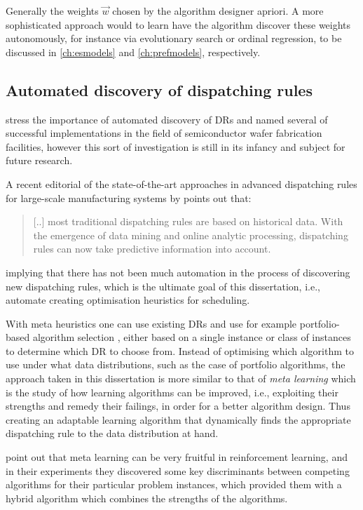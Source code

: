 Generally the weights $\vec{w}$ chosen by the algorithm designer apriori. 
A more sophisticated approach would to learn have the algorithm discover these weights autonomously, for instance via evolutionary search or ordinal regression, to be discussed in \cref{ch:esmodels} and \cref{ch:prefmodels}, respectively.

\subsection{Automated discovery of dispatching rules}
\citet{Monch13} stress the importance of automated discovery of DRs and named several of successful implementations in the field of semiconductor wafer fabrication facilities, however this sort of investigation is still in its infancy and subject for future research.

A recent editorial of the state-of-the-art approaches in advanced dispatching rules for large-scale manufacturing systems by \citet{Chen13} points out that:
\begin{quote}
[..] most traditional dispatching rules are based on historical data. With the emergence of data mining and online analytic processing, dispatching rules can now take predictive information into account.
\end{quote}
implying that there has not been much automation in the process of discovering new dispatching rules, which is the ultimate goal of this dissertation, i.e., automate creating optimisation heuristics for scheduling. 

With meta heuristics one can use existing DRs and use for example portfolio-based algorithm selection \citep{Rice76,Gomes01}, either based on a single instance or class of instances \citep{Xu07} to determine which DR to choose from. 
Instead of optimising which algorithm to use under what data distributions, such as the case of portfolio algorithms, the approach taken in this dissertation is more similar to that of \emph{meta learning} \citep{Vilalta02} which is the study of how learning algorithms can be improved, i.e., exploiting their strengths and remedy their failings, in order for a better algorithm design. Thus creating an adaptable learning algorithm that dynamically finds the appropriate dispatching rule  to the data distribution at hand. 

\citet{Kalyanakrishnan11} point out that meta learning can be very fruitful in reinforcement learning, and in their experiments they discovered some key discriminants between competing algorithms for their particular problem instances, which provided them with a hybrid algorithm which combines the strengths of the algorithms.

